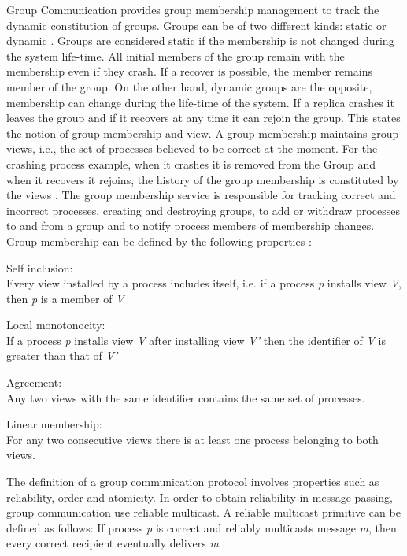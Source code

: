 Group Communication provides group membership management to track the dynamic constitution of groups. Groups can be of two different kinds: static or dynamic \cite{Guerraoui96fault-toleranceby}. Groups are considered static if the membership is not changed during the system life-time. All initial members of the group remain with the membership even if they crash. If a recover is possible, the member remains member of the group. On the other hand, dynamic groups are the opposite, membership can change during the life-time of the system. If a replica crashes it leaves the group and if it recovers at any time it can rejoin the group.
This states the notion of group membership and view. A group membership maintains group views, i.e., the set of processes believed to be correct at the moment. For the crashing process example, when it crashes it is removed from the Group and when it recovers it rejoins, the history of the group membership is constituted by the views \cite{Guerraoui:1997p555}.
The group membership service is responsible for tracking correct and incorrect processes, creating and destroying groups, to add or withdraw processes to and from a group and to notify process members of membership changes.
Group membership can be defined by the following properties \cite{Chockler:2001:GCS:503112.503113}:

\begin{description}
	\item Self inclusion:\\
		Every view installed by a process includes itself, i.e. if a process \textit{p} installs view \textit{V}, then \textit{p} is a member of \textit{V}
	\item Local monotonocity:\\
		If a process \textit{p} installs view \textit{V} after installing view \textit{V’} then the identifier of \textit{V} is greater than that of \textit{V’}
	\item Agreement:\\
		Any two views with the same identifier contains the same set of processes.
	\item Linear membership:\\
		For any two consecutive views there is at least one process belonging to both views.
\end{description}

The definition of a group communication protocol involves properties such as reliability, order and atomicity. In order to obtain reliability in message passing, group communication use reliable multicast. A reliable multicast primitive can be defined as follows: If process \textit{p} is correct and reliably multicasts message \textit{m}, then every correct recipient eventually delivers \textit{m} \cite{Hadzilacos94amodular}.

